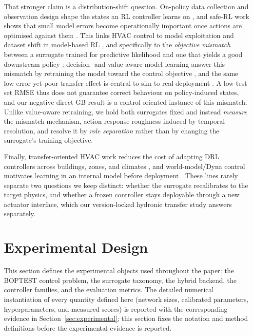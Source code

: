That stronger claim is a distribution-shift question. On-policy data collection and observation design shape the states an RL controller learns on \citep{Mayor2025Parallelized,Radac2025OnlineRL,Gao2024Predictive}, and safe-RL work shows that small model errors become operationally important once actions are optimised against them \citep{Garcia2015SafeRL,Wang2025SafeDRL}. This links HVAC control to model exploitation and dataset shift in model-based RL \citep{Quinonero2009DatasetShift,RiahiSamani2026OOD}, and specifically to the \emph{objective mismatch} between a surrogate trained for predictive likelihood and one that yields a good downstream policy \citep{Lambert2020ObjectiveMismatch,Janner2019MBPO}; decision- and value-aware model learning answer this mismatch by retraining the model toward the control objective \citep{Farahmand2017VAML}, and the same low-error-yet-poor-transfer effect is central to sim-to-real deployment \citep{Zhao2020Sim2Real}. A low test-set RMSE thus does not guarantee correct behaviour on policy-induced states, and our negative direct-GB result is a control-oriented instance of this mismatch. Unlike value-aware retraining, we hold both surrogates fixed and instead \emph{measure} the mismatch mechanism, action-response roughness induced by temporal resolution, and resolve it by \emph{role separation} rather than by changing the surrogate's training objective.

Finally, transfer-oriented HVAC work reduces the cost of adapting DRL controllers across buildings, zones, and climates \citep{Hou2024MultiSource,Coraci2024HeteroTL,Coraci2025HiLo,Meng2025Lifelong}, and world-model/Dyna control motivates learning in an internal model before deployment \citep{Sutton1991Dyna,Hafner2025Dreamer}. These lines rarely separate two questions we keep distinct: whether the surrogate recalibrates to the target physics, and whether a frozen controller stays deployable through a new actuator interface, which our version-locked hydronic transfer study answers separately.
\section{Experimental Design}\label{sec:methodology}
This section defines the experimental objects used throughout the paper: the BOPTEST control problem, the surrogate taxonomy, the hybrid backend, the controller families, and the evaluation metrics.
The detailed numerical instantiation of every quantity defined here (network
sizes, calibrated parameters, hyperparameters, and measured scores) is reported
with the corresponding evidence in Section~\ref{sec:experimental};
this section fixes the notation and method definitions before the experimental evidence is reported.


